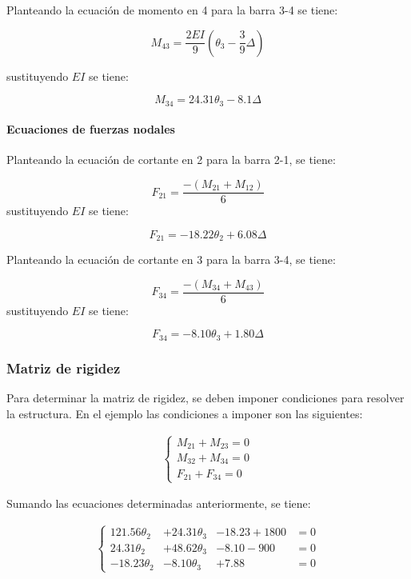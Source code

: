 Planteando la ecuación de momento en 4 para la barra 3-4 se tiene:

$$
M_{43} = \frac{2EI}{9} \left(\theta_3 - \frac{3}{9} \Delta \right)
$$

sustituyendo $EI$ se tiene:

\begin{equation}
\boxed{
	M_{34} = 24.31 \theta_3 - 8.1 \Delta
}
\end{equation}

\paragraph{Ecuaciones de fuerzas nodales}

Planteando la ecuación de cortante en 2 para la barra 2-1, se tiene:

$$
F_{21} = \frac{-(M_{21}+M_{12})}{6}
$$
sustituyendo $EI$ se tiene:

\begin{equation}
\boxed{
	F_{21} = -18.22 \theta_2 + 6.08 \Delta
}
\end{equation}

Planteando la ecuación de cortante en 3 para la barra 3-4, se tiene:

$$
F_{34} = \frac{-(M_{34}+M_{43})}{6}
$$
sustituyendo $EI$ se tiene:

\begin{equation}
\boxed{
	F_{34} = -8.10 \theta_3 + 1.80 \Delta
}
\end{equation}

\subsubsection{Matriz de rigidez}

Para determinar la matriz de rigidez, se deben imponer condiciones para resolver la estructura. En el ejemplo las condiciones a imponer son las siguientes:


\begin{eqnarray}
	\left\lbrace 
	\begin{array}{l}
	M_{21}+M_{23} = 0 \\
	M_{32}+M_{34} = 0 \\
	F_{21}+F_{34} = 0
	\end{array}
	\right.
\end{eqnarray}

Sumando las ecuaciones determinadas anteriormente, se tiene:

\begin{eqnarray}
	\left\lbrace 
	\begin{array}{llll}
	121.56 \theta_{2} &+ 24.31 \theta_{3} &-18.23 +1800 &= 0\\
	24.31 \theta_{2} &+ 48.62 \theta_{3} &-8.10 -900  &= 0\\
	-18.23 \theta_{2} &-8.10 \theta_{3} &+7.88 &= 0
	\end{array}
	\right.
\end{eqnarray}


